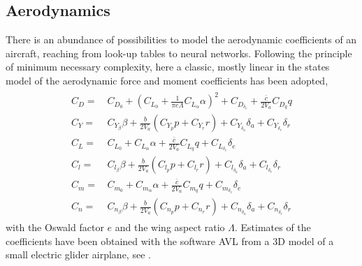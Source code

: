 \documentclass{ifacconf}
\begin{document}
\subsection{Aerodynamics}
There is an abundance of possibilities to model the aerodynamic coefficients of an aircraft, reaching from look-up tables to neural networks. Following the principle of minimum necessary complexity, here a classic, mostly linear in the states model of the aerodynamic force and moment coefficients has been adopted, \cite{Beard2012}
%
\begin{align}
\begin{split}
C_D =&\,C_{D_0} + \left(C_{L_0} + \frac{1}{\pi e \Lambda}C_{L_\alpha}\alpha\right)^2 + C_{D_{\delta_e}} + \frac{\bar{c}}{2V_a}C_{D_{q}}q
\label{eq:aerocoeffcd} \\
C_Y =&\,C_{Y_\beta}\beta + \frac{b}{2V_a} \left( C_{Y_p}p + C_{Y_r}r \right) + C_{Y_{\delta_a}}\delta_a + C_{Y_{\delta_r}}\delta_r\\
C_L =&\,C_{L_0} + C_{L_\alpha}\alpha +\frac{\bar{c}}{2V_a}C_{L_q}q +C_{L_{\delta_e}}\delta_e\\
C_l =&\,C_{l_{\beta}}\beta + \frac{b}{2V_a}\left(C_{l_{p}}p +C_{l_{r}}r\right) +C_{l_{\delta_a}}\delta_a +C_{l_{\delta_r}}\delta_r\\
C_m =&\,C_{m_0} + C_{m_\alpha}\alpha + \frac{\bar{c}}{2V_a}C_{m_q}q + C_{m_{\delta_e}}\delta_e\\
C_n =&\,C_{n_\beta}\beta + \frac{b}{2V_a} \left(C_{n_p}p + C_{n_r}r\right)+ C_{n_{\delta_a}} \! \delta_a+ C_{n_{\delta_r}}\!\delta_r
\end{split}
\end{align}
%
with the Oswald factor $e$ and the wing aspect ratio $\Lambda$. Estimates of the coefficients have been obtained with the software AVL from a 3D model of a small electric glider airplane, see \cite{StollePhD2016}.
\end{document}
